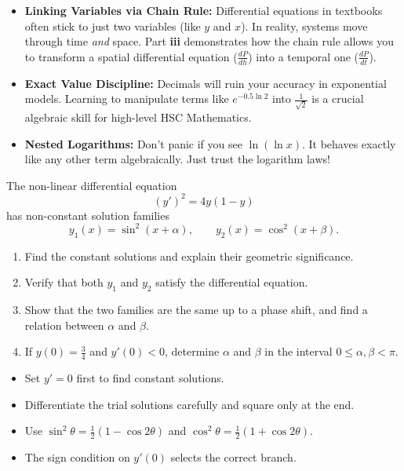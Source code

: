 \begin{takeaways}
\begin{itemize}[leftmargin=*]
    \item \textbf{Linking Variables via Chain Rule:} Differential equations in textbooks often stick to just two variables (like $y$ and $x$). In reality, systems move through time \textit{and} space. Part \textbf{iii} demonstrates how the chain rule allows you to transform a spatial differential equation ($\frac{dP}{dh}$) into a temporal one ($\frac{dP}{dt}$).
    \item \textbf{Exact Value Discipline:} Decimals will ruin your accuracy in exponential models. Learning to manipulate terms like $e^{-0.5 \ln 2}$ into $\frac{1}{\sqrt{2}}$ is a crucial algebraic skill for high-level HSC Mathematics.
    \item \textbf{Nested Logarithms:} Don't panic if you see $\ln(\ln x)$. It behaves exactly like any other term algebraically. Just trust the logarithm laws!
\end{itemize}
\end{takeaways}

\begin{problem}
The non-linear differential equation
\[
(y')^2=4y(1-y)
\]
has non-constant solution families
\[
y_1(x)=\sin^2(x+\alpha), \qquad y_2(x)=\cos^2(x+\beta).
\]

\begin{enumerate}
    \item[\textbf{i}] Find the constant solutions and explain their geometric significance.
    \item[\textbf{ii}] Verify that both $y_1$ and $y_2$ satisfy the differential equation.
    \item[\textbf{iii}] Show that the two families are the same up to a phase shift, and find a relation between $\alpha$ and $\beta$.
    \item[\textbf{iv}] If $y(0)=\frac34$ and $y'(0)<0$, determine $\alpha$ and $\beta$ in the interval $0\le \alpha,\beta<\pi$.
\end{enumerate}
\end{problem}

\begin{hint}
\begin{itemize}[leftmargin=*]
    \item Set $y'=0$ first to find constant solutions.
    \item Differentiate the trial solutions carefully and square only at the end.
    \item Use $\sin^2\theta=\frac12(1-\cos 2\theta)$ and $\cos^2\theta=\frac12(1+\cos 2\theta)$.
    \item The sign condition on $y'(0)$ selects the correct branch.
\end{itemize}
\end{hint}

